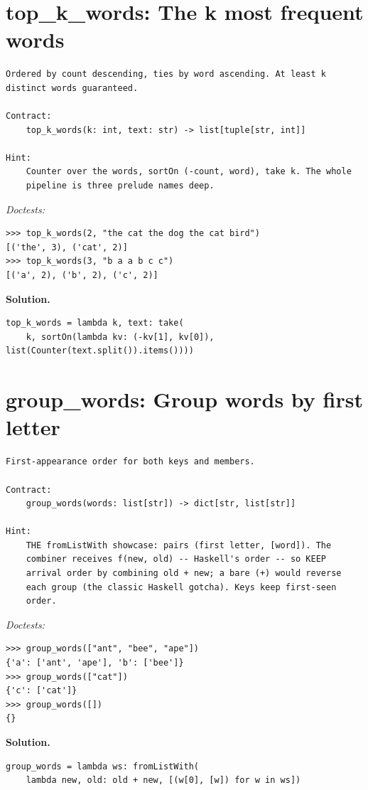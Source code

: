 \documentclass[11pt,letterpaper]{book}
\begin{document}
\section{top\_k\_words: The k most frequent words}
\begin{lstlisting}[style=spec]
Ordered by count descending, ties by word ascending. At least k
distinct words guaranteed.

Contract:
    top_k_words(k: int, text: str) -> list[tuple[str, int]]

Hint:
    Counter over the words, sortOn (-count, word), take k. The whole
    pipeline is three prelude names deep.
\end{lstlisting}
\noindent\textit{Doctests:}
\begin{lstlisting}[style=spec]
>>> top_k_words(2, "the cat the dog the cat bird")
[('the', 3), ('cat', 2)]
>>> top_k_words(3, "b a a b c c")
[('a', 2), ('b', 2), ('c', 2)]
\end{lstlisting}
\noindent\textbf{Solution.}
\begin{lstlisting}[style=code]
top_k_words = lambda k, text: take(
    k, sortOn(lambda kv: (-kv[1], kv[0]), list(Counter(text.split()).items())))
\end{lstlisting}

\section{group\_words: Group words by first letter}
\begin{lstlisting}[style=spec]
First-appearance order for both keys and members.

Contract:
    group_words(words: list[str]) -> dict[str, list[str]]

Hint:
    THE fromListWith showcase: pairs (first letter, [word]). The
    combiner receives f(new, old) -- Haskell's order -- so KEEP
    arrival order by combining old + new; a bare (+) would reverse
    each group (the classic Haskell gotcha). Keys keep first-seen
    order.
\end{lstlisting}
\noindent\textit{Doctests:}
\begin{lstlisting}[style=spec]
>>> group_words(["ant", "bee", "ape"])
{'a': ['ant', 'ape'], 'b': ['bee']}
>>> group_words(["cat"])
{'c': ['cat']}
>>> group_words([])
{}
\end{lstlisting}
\noindent\textbf{Solution.}
\begin{lstlisting}[style=code]
group_words = lambda ws: fromListWith(
    lambda new, old: old + new, [(w[0], [w]) for w in ws])
\end{lstlisting}
\end{document}
